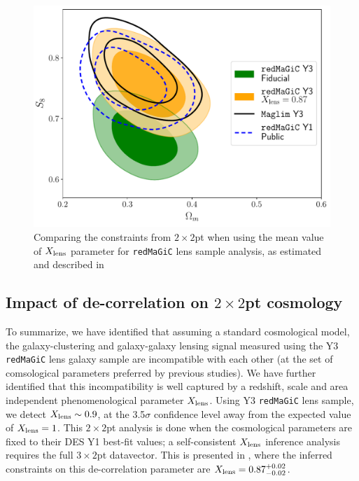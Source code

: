\documentclass[aps, prd,twocolumn,superscriptaddress,nofootinbib,preprintnumbers]{revtex4-1}
\newcommand{\redmagic}{\texttt{redMaGiC} }
\newcommand{\maglim}{\texttt{MagLim} }
\begin{document}
\begin{figure}
\includegraphics[width=\columnwidth]{figs/data_lcdm_wX_comp.pdf}
\caption[]{Comparing the constraints from $2\times2$pt when using the mean value of $X_{\rm lens}$ parameter for \redmagic lens sample analysis, as estimated and described in \citet*{y3-3x2ptkp} }\label{fig:X_comp_main}
\end{figure}

\subsection{Impact of de-correlation on $2\times 2$pt cosmology}
\label{sec:X_cosmo_impact}
To summarize, we have identified that assuming a standard cosmological model, the galaxy-clustering and galaxy-galaxy lensing signal measured using the Y3 \redmagic lens galaxy sample are incompatible with each other (at the set of comsological parameters preferred by previous studies). We have further identified that this incompatibility is well captured by a redshift, scale and area independent phenomenological parameter $X_{\rm lens}$. Using Y3 \redmagic lens sample, we detect $X_{\rm lens} \sim 0.9$, at the 3.5$\sigma$ confidence level away from the expected value of $X_{\rm lens} = 1$. This $2\times2$pt analysis is done when the cosmological parameters are fixed to their DES Y1 best-fit values; a self-consistent $X_{\rm lens}$ inference analysis requires the full $3\times2$pt datavector. This is presented in \citet*{y3-3x2ptkp}, where the inferred constraints on this de-correlation parameter are $X_{\rm lens} = 0.87^{+0.02}_{-0.02}$. 
\end{document}
